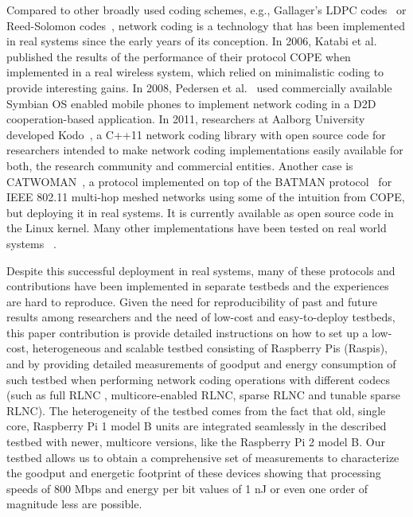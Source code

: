 Compared to other broadly used coding schemes, e.g., Gallager's LDPC
codes~\cite{gallager1962low} or Reed-Solomon
codes~\cite{reed1960polynomial}, network coding is a technology that
has been implemented in real systems since the early years of its
conception. In 2006, Katabi et al.~\cite{katabi2006practical} published
the results of the performance of their protocol COPE when implemented
in a real wireless system, which relied on minimalistic coding to
provide interesting gains. In 2008, Pedersen et
al.~\cite{pedersen2008implementation} used commercially available
Symbian OS enabled mobile phones to implement network coding in a
\ac{D2D} cooperation-based application. In 2011, researchers at Aalborg
University developed Kodo~\cite{kodo2011pedersen}, a C++11 network
coding library with open source code for researchers intended to make
network coding implementations easily available for both, the research
community and commercial entities.
Another case is CATWOMAN~\cite{hundeboll2012catwoman}, a protocol
implemented on top of the BATMAN protocol~\cite{johnson2008simple} for
IEEE 802.11 multi-hop meshed networks using some of the intuition from
COPE, but deploying it in real systems. It is currently available as
open source code in the Linux kernel. Many other implementations have
been tested on real world systems~
\cite{pahlevani2013playncool,katti2008xors,krigslund2013core,paramanathan2013leanandmean}.

Despite this successful deployment in real systems, many of these
protocols and contributions have been implemented in separate testbeds
and the experiences are hard to reproduce.  Given the need for
reproducibility of past and future results among researchers and the
need of low-cost and easy-to-deploy testbeds, this paper contribution
is provide detailed instructions on how to set up a low-cost,
heterogeneous and scalable testbed consisting of Raspberry Pis
(Raspis), and by providing detailed measurements of goodput and energy
consumption of such testbed when performing network coding operations
with different codecs (such as full \ac{RLNC} \cite{ho2006random},
multicore-enabled \ac{RLNC}, sparse \ac{RLNC} and tunable sparse \ac{RLNC}).
The heterogeneity of the testbed comes from the fact that old, single core,
Raspberry Pi 1 model B units are integrated seamlessly in the described
testbed with newer, multicore versions, like the Raspberry Pi 2 model B.
Our testbed allows us to obtain a comprehensive set of measurements
to characterize the goodput and energetic footprint of these devices
showing that processing speeds of 800 Mbps and energy per bit values
of 1 nJ or even one order of magnitude less are possible.

